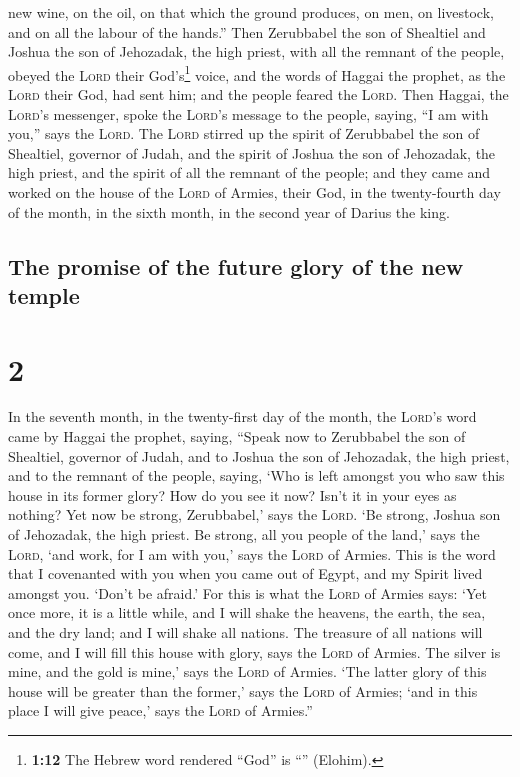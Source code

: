 new wine, on the oil, on that which the ground produces, on men, on
livestock, and on all the labour of the hands.''  Then
Zerubbabel the son of Shealtiel and Joshua the son of Jehozadak, the
high priest, with all the remnant of the people, obeyed the
\textsc{Lord} their God's\footnote{\textbf{1:12} The Hebrew word
  rendered ``God'' is ``'' (Elohim).} voice, and the words
of Haggai the prophet, as the \textsc{Lord} their God, had sent him; and
the people feared the \textsc{Lord}.  Then Haggai, the
\textsc{Lord}'s messenger, spoke the \textsc{Lord}'s message to the
people, saying, ``I am with you,'' says the \textsc{Lord}.
 The \textsc{Lord} stirred up the spirit of Zerubbabel
the son of Shealtiel, governor of Judah, and the spirit of Joshua the
son of Jehozadak, the high priest, and the spirit of all the remnant of
the people; and they came and worked on the house of the \textsc{Lord}
of Armies, their God,  in the twenty-fourth day of the
month, in the sixth month, in the second year of Darius the king.

\hypertarget{the-promise-of-the-future-glory-of-the-new-temple}{%
\subsection{The promise of the future glory of the new
temple}\label{the-promise-of-the-future-glory-of-the-new-temple}}

\hypertarget{section-1}{%
\section{2}\label{section-1}}

 In the seventh month, in the twenty-first day of the
month, the \textsc{Lord}'s word came by Haggai the prophet, saying,
 ``Speak now to Zerubbabel the son of Shealtiel, governor
of Judah, and to Joshua the son of Jehozadak, the high priest, and to
the remnant of the people, saying,  `Who is left amongst
you who saw this house in its former glory? How do you see it now? Isn't
it in your eyes as nothing?  Yet now be strong,
Zerubbabel,' says the \textsc{Lord}. `Be strong, Joshua son of
Jehozadak, the high priest. Be strong, all you people of the land,' says
the \textsc{Lord}, `and work, for I am with you,' says the \textsc{Lord}
of Armies.  This is the word that I covenanted with you
when you came out of Egypt, and my Spirit lived amongst you. `Don't be
afraid.'  For this is what the \textsc{Lord} of Armies
says: `Yet once more, it is a little while, and I will shake the
heavens, the earth, the sea, and the dry land;  and I will
shake all nations. The treasure of all nations will come, and I will
fill this house with glory, says the \textsc{Lord} of Armies.
 The silver is mine, and the gold is mine,' says the
\textsc{Lord} of Armies.  `The latter glory of this house
will be greater than the former,' says the \textsc{Lord} of Armies; `and
in this place I will give peace,' says the \textsc{Lord} of Armies.''

